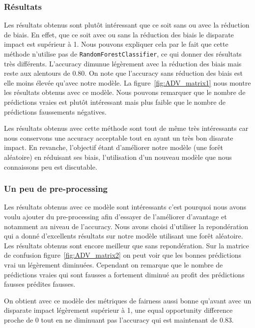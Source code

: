 \documentclass{article}
\begin{document}
    \subsubsection{Résultats}
    Les résultats obtenus sont plutôt intéressant que ce soit sans ou avec la réduction de biais. En effet, que ce soit 
    avec ou sans la réduction des biais le disparate impact est supérieur à 1. Nous pouvons expliquer cela par le fait 
    que cette méthode n'utilise pas de \texttt{RandomForestClassifier}, ce qui donner des résultats très différents. 
    L'accuracy dimunue légèrement avec la réduction des biais mais reste aux alentours de $0.80$. On note que l'accuracy 
    sans réduction des biais est elle moins élevée qu'avec notre modèle. La figure~\ref{fig:ADV_matrix1} nous montre les 
    résultats obtenus avec ce modèle. Nous pouvons remarquer que le nombre de prédictions vraies est plutôt 
    intéressant mais plus faible que le nombre de prédictions faussements négatives. 
    
    Les résultats obtenus avec cette méthode sont tout de même très intéressants car nous conservons une accuracy 
    acceptable tout en ayant un très bon disarate impact. En revanche, l'objectif étant d'améliorer notre modèle 
    (une forêt aléatoire) en réduisant ses biais, l'utilisation d'un nouveau modèle que nous connaissons peu 
    est discutable.

    \subsubsection{Un peu de pre-processing}
    Les résultats obtenus avec ce modèle sont intéressants c'est pourquoi nous avons voulu ajouter 
    du pre-processing afin d'essayer de l'améliorer d'avantage et notamment au niveau de l'accuracy.
    Nous avons choisi d'utiliser la repondération qui a donné d'excellents résultats sur notre 
    modèle utilisant une forêt aléatoire.
    Les résultats obtenus sont encore meilleur que sans repondération. Sur la matrice de confusion 
    figure~\ref{fig:ADV_matrix2} on peut voir que les bonnes prédictions vrai un légèrement diminuées. 
    Cependant on remarque que le nombre de prédictions vraies qui sont fausses a fortement diminué au 
    profit des prédictions fausses prédites fausses. 
    
    On obtient avec ce modèle des métriques de fairness aussi bonne qu'avant avec un disparate impact 
    légèrement supérieur à 1, une equal opportunity difference proche de 0 tout en ne diminuant pas 
    l'accuracy qui est maintenant de $0.83$.
\end{document}
